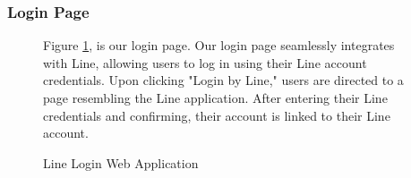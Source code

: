 \documentclass[12pt,oneside,openright,a4paper]{cpe-english-project}
\begin{document}
        \subsubsection{Login Page}
          \begin{figure}[H]
            \centering
            \begin{minipage}{.5\textwidth}
              \centering
            \end{minipage}%
            \begin{minipage}{.5\textwidth}
              \centering
            \end{minipage}%
          
            \caption{Line Login Web Application}\label{fig:WebAppLineLogin}
            \begin{justify}
              \qquad Figure \ref{fig:WebAppLineLogin}, is our login page. Our login page seamlessly integrates with Line, allowing users to log in using their Line account credentials. Upon clicking "Login by Line," users are directed to a page resembling the Line application. After entering their Line credentials and confirming, their account is linked to their Line account.\par
            \end{justify}
          \end{figure}
\end{document}
